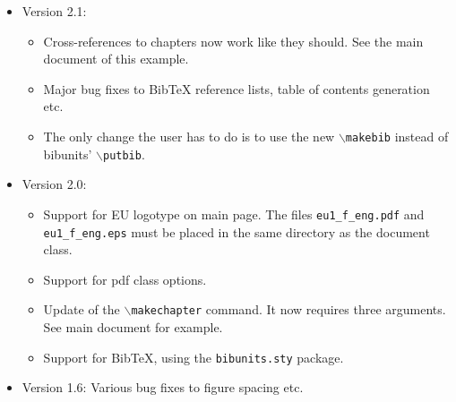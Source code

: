 \begin{itemize}
    \item Version 2.1:
    \begin{itemize}
        \item Cross-references to chapters now work like they
        should. See the main document of this example.
        \item Major bug fixes to BibTeX reference lists, table of
        contents generation etc.
        \item The only change the user has to do is to use the new \texttt{$\backslash$makebib} instead of
        bibunits' \texttt{$\backslash$putbib}.
    \end{itemize}
    \item Version 2.0:
    \begin{itemize}
        \item Support for EU logotype on main page. The files
        \texttt{eu1\_f\_eng.pdf} and\\ \texttt{eu1\_f\_eng.eps} must be
        placed in the same directory as the document class.
        \item Support for pdf class options.
        \item Update of the \texttt{$\backslash$makechapter}
        command. It now requires three arguments. See main
        document for example.
        \item Support for BibTeX, using the \texttt{bibunits.sty}
        package.
    \end{itemize}
    \item Version 1.6: Various bug fixes to figure spacing etc.
\end{itemize}

